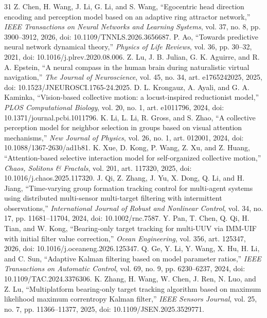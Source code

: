 \documentclass[UTF8,fontset=windows,11pt]{ctexart}
\begin{document}
\begin{thebibliography}{31}
 Z. Chen, H. Wang, J. Li, G. Li, and S. Wang, ``Egocentric head direction encoding and perception model based on an adaptive ring attractor network,'' \emph{IEEE Transactions on Neural Networks and Learning Systems}, vol. 37, no. 8, pp. 3900--3912, 2026, doi: 10.1109/TNNLS.2026.3656687.
 P. Ao, ``Towards predictive neural network dynamical theory,'' \emph{Physics of Life Reviews}, vol. 36, pp. 30--32, 2021, doi: 10.1016/j.plrev.2020.08.006.
 Z. Lu, J. B. Julian, G. K. Aguirre, and R. A. Epstein, ``A neural compass in the human brain during naturalistic virtual navigation,'' \emph{The Journal of Neuroscience}, vol. 45, no. 34, art. e1765242025, 2025, doi: 10.1523/JNEUROSCI.1765-24.2025.
 D. L. Krongauz, A. Ayali, and G. A. Kaminka, ``Vision-based collective motion: a locust-inspired reductionist model,'' \emph{PLOS Computational Biology}, vol. 20, no. 1, art. e1011796, 2024, doi: 10.1371/journal.pcbi.1011796.
 K. Li, L. Li, R. Gross, and S. Zhao, ``A collective perception model for neighbor selection in groups based on visual attention mechanisms,'' \emph{New Journal of Physics}, vol. 26, no. 1, art. 012001, 2024, doi: 10.1088/1367-2630/ad1b81.
 K. Xue, D. Kong, P. Wang, Z. Xu, and Z. Huang, ``Attention-based selective interaction model for self-organized collective motion,'' \emph{Chaos, Solitons \& Fractals}, vol. 201, art. 117320, 2025, doi: 10.1016/j.chaos.2025.117320.
 J. Qi, Z. Zhang, J. Yu, X. Dong, Q. Li, and H. Jiang, ``Time-varying group formation tracking control for multi-agent systems using distributed multi-sensor multi-target filtering with intermittent observations,'' \emph{International Journal of Robust and Nonlinear Control}, vol. 34, no. 17, pp. 11681--11704, 2024, doi: 10.1002/rnc.7587.
 Y. Pan, T. Chen, Q. Qi, H. Tian, and W. Kong, ``Bearing-only target tracking for multi-UUV via IMM-UIF with initial filter value correction,'' \emph{Ocean Engineering}, vol. 356, art. 125347, 2026, doi: 10.1016/j.oceaneng.2026.125347.
 Q. Ge, Y. Li, Y. Wang, X. Hu, H. Li, and C. Sun, ``Adaptive Kalman filtering based on model parameter ratios,'' \emph{IEEE Transactions on Automatic Control}, vol. 69, no. 9, pp. 6230--6237, 2024, doi: 10.1109/TAC.2024.3376306.
 K. Zhang, H. Wang, W. Chen, J. Ren, N. Luo, and Z. Lu, ``Multiplatform bearing-only target tracking algorithm based on maximum likelihood maximum correntropy Kalman filter,'' \emph{IEEE Sensors Journal}, vol. 25, no. 7, pp. 11366--11377, 2025, doi: 10.1109/JSEN.2025.3529771.

\end{thebibliography}
\end{document}
